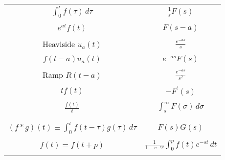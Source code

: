 \begin{center}
\begin{tabular}{|c|c|}
$\int_{0}^{t}f(\tau) \, d \tau$&$\frac{1}{s}F(s)$\\
& \\
$e^{at}f(t)$&$F(s-a)$\\
& \\
Heaviside  $ u_a(t)$&$\frac{e^{-as}}{s}$\\
& \\
$f(t-a)u_a(t)$&$e^{-as}F(s)$\\
& \\
Ramp $ R(t-a)$ &  $\frac{e^{-as}}{s^2} $ \\
& \\
$tf(t)$&$-F^{\prime}(s)$\\
& \\
${\displaystyle \frac{f(t)}{t}}$
&${\displaystyle \int_{s}^{\infty}F(\sigma)\, d\sigma}$\\
\hspace*{1pt}&\hspace*{1pt}\\
& \\
$(f\ast g)(t) \equiv {\displaystyle \int_{0}^{t}}f(t-\tau)g(\tau) \, d
\tau$&$F(s)G(s)$\\
& \\
$f(t)=f(t+p)$&${\displaystyle
\frac{1}{1-e^{-sp}}\int_{0}^{p}f(t)e^{-st}\, dt}$\\
\hspace*{1pt}&\hspace*{1pt}\\
\hline
\end{tabular}
\end{center}


